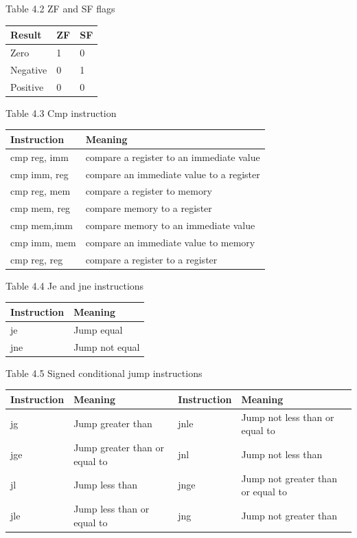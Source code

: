 \documentclass[10pt]{book}
\begin{document}
Table 4.2 ZF and SF flags

\begin{center}
\begin{tabular}{|l|l|l|}
\hline
Result & ZF & SF \\
\hline
Zero & 1 & 0 \\
\hline
Negative & 0 & 1 \\
\hline
Positive & 0 & 0 \\
\hline
\end{tabular}
\end{center}

Table 4.3 Cmp instruction

\begin{center}
\begin{tabular}{|l|l|}
\hline
Instruction & Meaning \\
\hline
cmp reg, imm & compare a register to an immediate value \\
\hline
cmp imm, reg & compare an immediate value to a register \\
\hline
cmp reg, mem & compare a register to memory \\
\hline
cmp mem, reg & compare memory to a register \\
\hline
cmp mem,imm & compare memory to an immediate value \\
\hline
cmp imm, mem & compare an immediate value to memory \\
\hline
cmp reg, reg & compare a register to a register \\
\hline
\end{tabular}
\end{center}

Table 4.4 Je and jne instructions


\begin{center}
\begin{tabular}{|l|l|}
\hline
Instruction & Meaning \\
\hline
je & Jump equal \\
\hline
jne & Jump not equal \\
\hline
\end{tabular}
\end{center}

Table 4.5 Signed conditional jump instructions

\begin{center}
\begin{tabular}{|l|l|l|l|}
\hline
Instruction & Meaning & Instruction & Meaning \\
\hline
jg & Jump greater than & jnle & Jump not less than or equal to \\
\hline
jge & Jump greater than or equal to & jnl & Jump not less than \\
\hline
jl & Jump less than & jnge & Jump not greater than or equal to \\
jle & Jump less than or equal to & jng & Jump not greater than \\
\hline
\end{tabular}
\end{center}
\end{document}
